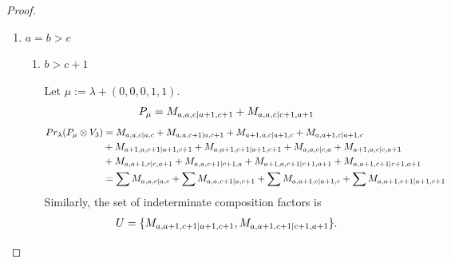 \begin{proof}
\begin{enumerate}
\begin{enumerate}
\begin{table}[htbp]
\begin{tabular}{cc}
    $P_{b+2,b+1,b+1|b+1,b+2}$ & \makecell{
$M_{b+3,b+1,b+1|b+1,b+3},
M_{b+2,b+2,b+1|b+2,b+2},
M_{b+2,b+1,b+2|b+2,b+2},$ \\
$M_{b+3,b+2,b+1|b+3,b+2},
M_{b+3,b+2,b+1|b+2,b+3}, 
M_{b+2,b+3,b+1|b+2,b+3},$ \\
$M_{b+3,b+1,b+2|b+3,b+2},
M_{b+3,b+1,b+2|b+2,b+3},
M_{b+2,b+1,b+3|b+2,b+3}$
    } \\
\bottomrule
\end{tabular}
\vspace{0.5em}
\parbox{\linewidth}{\small
\textbf{Interpretation:} 
This table displays only selected computational results. This partial presentation does not affect our conclusion.
}
\end{table}
    \end{enumerate}

  \item $a=b>c$
    \begin{enumerate}
      \item $b>c+1$ \par
        Let $\mu:=\lambda + (0,0,0,1,1) $. 
        \begin{equation}\notag
          \begin{aligned}
            P_\mu = M_{a,a,c|a+1,c+1}
+M_{a,a,c|c+1,a+1}
          \end{aligned}
        \end{equation}
        \begin{equation}\notag
          \begin{aligned}
            Pr_{\lambda}(P_\mu \otimes V_{3}) &= 
M_{a,a,c|a,c}
+M_{a,a,c+1|a,c+1}
+M_{a+1,a,c|a+1,c}
+M_{a,a+1,c|a+1,c}\\
                                            &
+M_{a+1,a,c+1|a+1,c+1}
+M_{a,a+1,c+1|a+1,c+1}
+M_{a,a,c|c,a}
+M_{a+1,a,c|c,a+1}\\
                                            &
+M_{a,a+1,c|c,a+1}
+M_{a,a,c+1|c+1,a}
+M_{a+1,a,c+1|c+1,a+1}
+M_{a,a+1,c+1|c+1,a+1} \\
                                               &=
\sum M_{a,a,c|a,c}
+\sum M_{a,a,c+1|a,c+1}
+\sum M_{a,a+1,c|a+1,c}
+\sum M_{a,a+1,c+1|a+1,c+1}
          \end{aligned}
        \end{equation}
      Similarly, the set of indeterminate composition factors is 
\begin{equation}\notag
  \begin{aligned}
    U = \{
M_{a,a+1,c+1|a+1,c+1},
M_{a,a+1,c+1|c+1,a+1}
\}.

\end{aligned}
\end{equation}
\end{enumerate}
\end{enumerate}
\end{proof}
